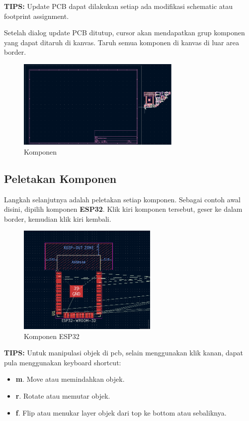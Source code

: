\documentclass[12pt]{book}
\begin{document}
	\textbf{TIPS:} Update PCB dapat dilakukan setiap ada modifikasi schematic atau footprint assignment.

	\newpage
	Setelah dialog update PCB ditutup, cursor akan mendapatkan grup komponen yang dapat ditaruh di kanvas.
	Taruh semua komponen di kanvas di luar area border.

	\begin{figure}[!ht]
		\centering
		\includegraphics[width=0.7\textwidth]{images/pcb/pcb_3}
		\caption{Komponen}
	\end{figure}

	\subsection{Peletakan Komponen}

	Langkah selanjutnya adalah peletakan setiap komponen.
	Sebagai contoh awal disini, dipilih komponen \textbf{ESP32}.
	Klik kiri komponen tersebut, geser ke dalam border, kemudian klik kiri kembali.

	\begin{figure}[!ht]
		\centering
		\includegraphics[width=0.6\textwidth]{images/pcb/pcb_4}
		\caption{Komponen ESP32}
	\end{figure}

	\textbf{TIPS:} Untuk manipulasi objek di pcb, selain menggunakan klik kanan, dapat pula menggunakan
	keyboard shortcut:
	\begin{itemize}
		\item \textbf{m}. Move atau memindahkan objek.

		\item \textbf{r}. Rotate atau memutar objek.

		\item \textbf{f}. Flip atau menukar layer objek dari top ke bottom atau sebaliknya.
	\end{itemize}
\end{document}

